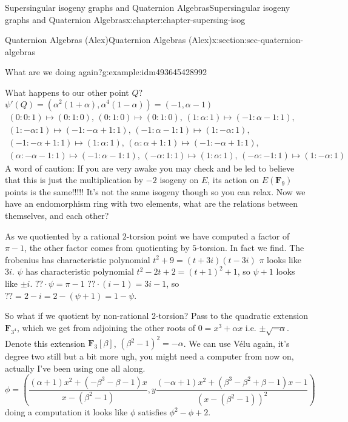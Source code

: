\documentclass[oneside,10pt,]{book}
\numberwithin{equation}{section}
\newcommand{\lb}{[}
\newcommand{\rb}{]}
\newcommand{\FF}{\mathbf{F}}
\begin{document}
\begin{chapterptx}{Supersingular isogeny graphs and Quaternion Algebras}{}{Supersingular isogeny graphs and Quaternion Algebras}{}{}{x:chapter:chapter-supersing-isog}
\begin{sectionptx}{Quaternion Algebras (Alex)}{}{Quaternion Algebras (Alex)}{}{}{x:section:sec-quaternion-algebras}
\begin{introduction}{}
\begin{example}{What are we doing again?}{g:example:idm493645428992}
%
\par
What happens to our other point \(Q\)? \(\psi'(Q) = (\alpha^2(1+\alpha), \alpha^4(1-\alpha)) =(-1, \alpha - 1)\)%
\begin{gather*}
(0 : 0 : 1) \mapsto (0 : 1 : 0),\, (0 : 1 : 0) \mapsto (0 : 1 : 0),\, (1 : \alpha : 1) \mapsto (-1 : \alpha -1 : 1),\\
(1 : -\alpha : 1) \mapsto (-1 : -\alpha + 1 : 1),\, (-1 : \alpha -1 : 1) \mapsto (1 : -\alpha : 1),\\
(-1 : -\alpha + 1 : 1) \mapsto (1 : \alpha : 1),\, (\alpha : \alpha + 1 : 1) \mapsto (-1 : -\alpha + 1 : 1),\\
(\alpha : -\alpha -1 : 1) \mapsto (-1 : \alpha -1 : 1),\, (-\alpha : 1 : 1) \mapsto (1 : \alpha : 1),\, (-\alpha : -1 : 1) \mapsto (1 : -\alpha : 1)
\end{gather*}
A word of caution: If you are very awake you may check and be led to believe that this is just the multiplication by \(-2\) isogeny on \(E\), its action on \(E(\FF_9)\) points is the same!!!!! It's not the same isogeny though so you can relax. Now we have an endomorphism ring with two elements, what are the relations between themselves, and each other?%
\par
As we quotiented by a rational \(2\)-torsion point we have computed a factor of \(\pi - 1\), the other factor comes from quotienting by \(5\)-torsion. In fact we find. The frobenius has characteristic polynomial \(t^2 + 9 = (t + 3i)(t-3i)\) \(\pi\) looks like \(3i\). \(\psi\) has characteristic polynomial \(t^2 - 2t + 2 = (t+1)^2 + 1\), so \(\psi + 1\) looks like \(\pm i\). \(?? \cdot \psi = \pi - 1\)  \(?? \cdot (i - 1) = 3i - 1\), so \(?? = 2 - i = 2 - (\psi + 1) = 1 - \psi\).%
\par
So what if we quotient by non-rational 2-torsion? Pass to the quadratic extension \(\FF_{3^4}\), which we get from adjoining the other roots of \(0 = x^3 + \alpha x\) i.e. \(\pm \sqrt{-\alpha}\). Denote this extension \(\FF_3 \lb \beta \rb\),  \((\beta^2 - 1)^2 = -\alpha\). We can use Vélu again, it's degree two still but a bit more ugh, you might need a computer from now on, actually I've been using one all along.%
\begin{equation*}
\phi = \left( \frac{\left(\alpha + 1\right) x^{2} + \left(- \beta^{3}  -  \beta - 1\right) x}{x -   (\beta^{2} - 1)},y \frac{\left(-\alpha + 1\right) x^{2} + \left(\beta^{3}  -  \beta^{2} + \beta - 1\right) x -  1}{(x -  ( \beta^{2} - 1))^2} \right)
\end{equation*}
doing a computation it looks like \(\phi\) satisfies \(\phi^2 -\phi + 2\).%

\end{example}
\end{introduction}
\end{sectionptx}
\end{chapterptx}
\end{document}
